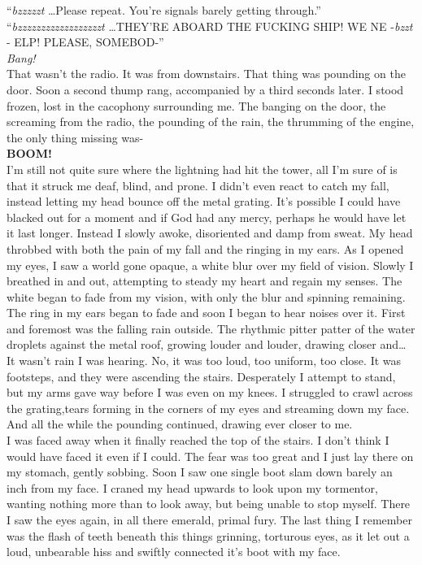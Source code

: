 \documentclass[a5paper]{scrartcl}
\begin{document}
\enquote{\textit{bzzzzzt}
\dots  Please repeat. You're signals barely getting through.}\\


\enquote{\textit{bzzzzzzzzzzzzzzzzzzt}
\dots  THEY'RE ABOARD THE FUCKING SHIP! WE NE -\textit{bzzt}
- ELP! PLEASE, SOMEBOD-}\\


\textit{Bang!}
\\


That wasn't the radio. It was from downstairs. That thing was pounding on the door. Soon a second thump rang, accompanied by a third seconds later. I stood frozen, lost in the cacophony surrounding me. The banging on the door, the screaming from the radio, the pounding of the rain, the thrumming of the engine, the only thing missing was-\\


\textbf{BOOM!}
\\


I'm still not quite sure where the lightning had hit the tower, all I'm sure of is that it struck me deaf, blind, and prone. I didn't even react to catch my fall, instead letting my head bounce off the metal grating. It's possible I could have blacked out for a moment and if God had any mercy, perhaps he would have let it last longer. Instead I slowly awoke, disoriented and damp from sweat. My head throbbed with both the pain of my fall and the ringing in my ears. As I opened my eyes, I saw a world gone opaque, a white blur over my field of vision. Slowly I breathed in and out, attempting to steady my heart and regain my senses. The white began to fade from my vision, with only the blur and spinning remaining. The ring in my ears began to fade and soon I began to hear noises over it. First and foremost was the falling rain outside. The rhythmic pitter patter of the water droplets against the metal roof, growing louder and louder, drawing closer and\dots \\


It wasn't rain I was hearing. No, it was too loud, too uniform, too close. It was footsteps, and they were ascending the stairs. Desperately I attempt to stand, but my arms gave way before I was even on my knees. I struggled to crawl across the grating,tears forming in the corners of my eyes and streaming down my face. And all the while the pounding continued, drawing ever closer to me.\\


I was faced away when it finally reached the top of the stairs. I don't think I would have faced it even if I could. The fear was too great and I just lay there on my stomach, gently sobbing. Soon I saw one single boot slam down barely an inch from my face. I craned my head upwards to look upon my tormentor, wanting nothing more than to look away, but being unable to stop myself. There I saw the eyes again, in all there emerald, primal fury. The last thing I remember was the flash of teeth beneath this things grinning, torturous eyes, as it let out a loud, unbearable hiss and swiftly connected it's boot with my face.\\
\end{document}
